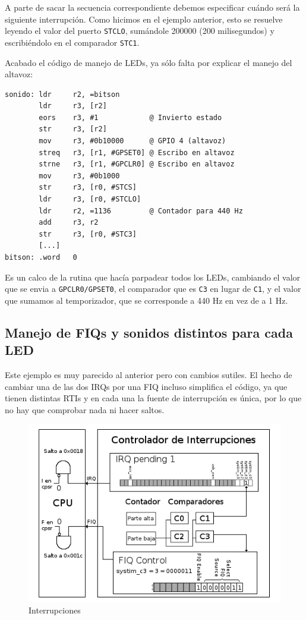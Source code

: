 A parte de sacar la secuencia correspondiente debemos especificar cuándo será la siguiente
interrupción. Como hicimos en el ejemplo anterior, esto se resuelve leyendo el valor del
puerto {\tt STCLO}, sumándole 200000 (200 milisegundos) y escribiéndolo en el comparador
{\tt STC1}.

Acabado el código de manejo de LEDs, ya sólo falta por explicar el manejo del altavoz:

\begin{lstlisting}
sonido: ldr     r2, =bitson
        ldr     r3, [r2]
        eors    r3, #1            @ Invierto estado
        str     r3, [r2]
        mov     r3, #0b10000      @ GPIO 4 (altavoz)
        streq   r3, [r1, #GPSET0] @ Escribo en altavoz
        strne   r3, [r1, #GPCLR0] @ Escribo en altavoz
        mov     r3, #0b1000
        str     r3, [r0, #STCS]
        ldr     r3, [r0, #STCLO]
        ldr     r2, =1136         @ Contador para 440 Hz
        add     r3, r2
        str     r3, [r0, #STC3]
        [...]
bitson: .word   0
\end{lstlisting}

Es un calco de la rutina que hacía parpadear todos los LEDs, cambiando
el valor que se envia a {\tt GPCLR0/GPSET0}, el comparador que es {\tt C3} en lugar de {\tt C1},
y el valor que sumamos al temporizador, que se corresponde a 440 Hz en vez de a 1 Hz.

\subsection{Manejo de FIQs y sonidos distintos para cada LED}

Este ejemplo es muy parecido al anterior pero con cambios sutiles. El hecho de cambiar una de
las dos IRQs por una FIQ incluso simplifica el código, ya que tienen distintas RTIs y en cada
una la fuente de interrupción es única, por lo que no hay que comprobar nada ni hacer saltos.

\begin{figure}[h]
  \centering
    \includegraphics[width=14cm]{graphs/inter5.png}
  \caption{Interrupciones}
  \label{fig:inter5}
\end{figure}

